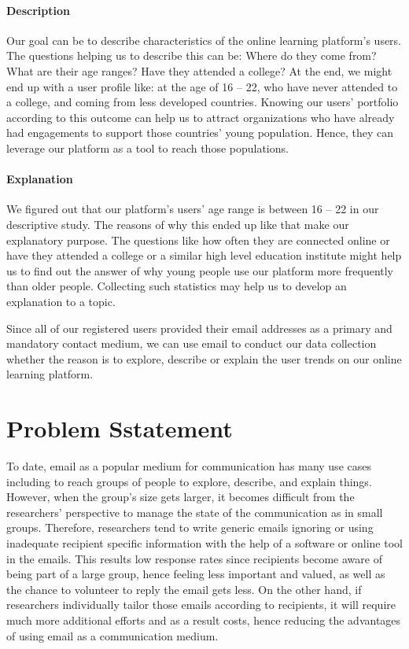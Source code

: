 \paragraph{Description}
Our goal can be to describe characteristics of the online learning platform's users. The questions helping us to describe this can be: Where do they come from? What are their age ranges? Have they attended a college? At the end, we might end up with a user profile like: at the age of 16 -- 22, who have never attended to a college, and coming from less developed countries. Knowing our users' portfolio according to this outcome can help us to attract organizations who have already had engagements to support those countries' young population. Hence, they can leverage our platform as a tool to reach those populations.

\paragraph{Explanation}
We figured out that our platform's users' age range is between 16 -- 22 in our descriptive study. The reasons of why this ended up like that make our explanatory purpose. The questions like how often they are connected online or have they attended a college or a similar high level education institute might help us to find out the answer of why young people use our platform more frequently than older people. Collecting such statistics may help us to develop an explanation to a topic.

\vspace{1cm}
Since all of our registered users provided their email addresses as a primary and mandatory contact medium, we can use email to conduct our data collection whether the reason is to explore, describe or explain the user trends on our online learning platform.

\section{Problem Sstatement}
\label{sec:2:Problem}

To date, email as a popular medium for communication has many use cases including to reach groups of people to explore, describe, and explain things. However, when the group's size gets larger, it becomes difficult from the researchers' perspective to manage the state of the communication as in small groups. Therefore, researchers tend to write generic emails ignoring or using inadequate recipient specific information with the help of a software or online tool in the emails. This results low response rates since recipients become aware of being part of a large group, hence feeling less important and valued, as well as the chance to volunteer to reply the email gets less. On the other hand, if researchers individually tailor those emails according to recipients, it will require much more additional efforts and as a result costs, hence reducing the advantages of using email as a communication medium.
\vspace{1cm}

